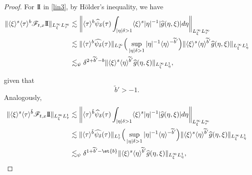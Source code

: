 \documentclass[a4paper, 11pt]{amsart}
\newcommand{\jap}[1]{\langle #1 \rangle}
\theoremstyle{plain}
\theoremstyle{definition}
\theoremstyle{remark}
\newcommand{\II}{\text{I \hspace{-2.9mm} I} }
\newcommand{\5}{\text{V}}
\newcommand{\noi}{\noindent}
\newcommand{\ft}{\widehat}
\newcommand{\les}{\lesssim}
\newcommand{\dl}{\delta}
\newcommand{\F}{\mathcal{F}}
\newcommand{\wt}{\widetilde}
\numberwithin{equation}{section}
\theoremstyle{mytheoremstyle} \newtheorem{nota}[thm]{Remark}
\theoremstyle{mytheoremstyle} \newtheorem{exemplo}[thm]{Example}
\begin{document}
\begin{proof}
\noi
For $\II$ in \eqref{lin3}, by H\"older's inequality, we have
\begin{equation}
\begin{aligned}
\| \jap{\xi}^s \jap{\tau}^b \F_{t,x} \II \|_{L^\infty_\xi L^\infty_\tau} & \les \bigg\| \jap{\tau}^b \ft{\psi}_\dl(\tau) \int_{|\eta|\dl >1} \jap{\xi}^s |\eta|^{-1} | \ft{g}(\eta, \xi)| d\eta \bigg\|_{L^\infty_\xi L^\infty_\tau} \\
& \les \| \jap{\tau}^b \ft{\psi_\dl}(\tau) \|_{L^\infty_\tau} \Big( \sup_{|\eta| \dl >1} |\eta|^{-1} \jap{\eta}^{-\wt{b}'} \Big) \| \jap{\xi}^s \jap{\eta}^{\wt{b}'} \ft{g}(\eta, \xi) \|_{L^\infty_\xi L^1_\eta} \\
& \les_\psi \dl^{2 + \wt{b}' - b} \| \jap{\xi}^s \jap{\eta}^{\wt{b}'} \ft{g}(\eta, \xi) \|_{L^\infty_\xi L^1_\eta},
\end{aligned}
\label{lin5a}
\end{equation}

\noi
given that
\begin{equation}
\wt{b}'>-1.
\label{lin5b}
\end{equation}
Analogously,
\begin{equation}
\begin{aligned}
\| \jap{\xi}^s \jap{\tau}^{\tilde{b}} \F_{t,x} \II \|_{L^\infty_\xi L^1_\tau} & \les \bigg\| \jap{\tau}^{\tilde{b}} \ft{\psi}_\dl(\tau) \int_{|\eta|\dl >1} \jap{\xi}^s |\eta|^{-1} | \ft{g}(\eta, \xi)| d\eta \bigg\|_{L^\infty_\xi L^\infty_\tau} \\
& \les \| \jap{\tau}^{\tilde{b}} \ft{\psi_\dl}(\tau) \|_{L^1_\tau} \Big( \sup_{|\eta| \dl >1} |\eta|^{-1} \jap{\eta}^{-\wt{b}'} \Big) \| \jap{\xi}^s \jap{\eta}^{\wt{b}'} \ft{g}(\eta, \xi) \|_{L^\infty_\xi L^1_\eta} \\
& \les_\psi \dl^{1 + \wt{b}' - \et{b}} \| \jap{\xi}^s \jap{\eta}^{\wt{b}'} \ft{g}(\eta, \xi) \|_{L^\infty_\xi L^1_\eta},
\end{aligned}
\label{lin5c}
\end{equation}





\end{proof}
\end{document}
